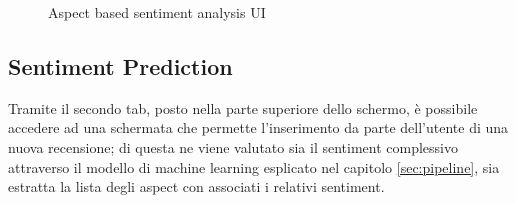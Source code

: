 \documentclass[hidelinks, 12pt]{article}
\begin{document}
\begin{figure}[H]
	\centering
	\endminipage
	\hfill
	\endminipage
	\caption{Aspect based sentiment analysis UI}
	\label{fig:aspect_ui_list}
\end{figure}



\subsection{Sentiment Prediction}

Tramite il secondo tab, posto nella parte superiore dello schermo, è possibile accedere ad una schermata che permette l'inserimento da parte dell'utente di una nuova recensione; di questa ne viene valutato sia il sentiment complessivo attraverso il modello di machine learning esplicato nel capitolo \ref{sec:pipeline}, sia estratta la lista degli aspect con associati i relativi sentiment.
\end{document}
